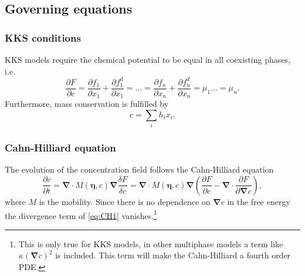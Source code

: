 \documentclass[12pt,a4paper]{article}
\newcommand{\vardiff}[2]{\frac{\delta#1}{\delta#2}}
\newcommand{\partdiff}[2]{\frac{\partial#1}{\partial#2}}
\providecommand{\vbf}[1]{\boldsymbol{#1}}
\providecommand{\gradient}[0]{\vbf{\nabla}}
\begin{document}
\subsection{Governing equations}
\subsubsection{KKS conditions}
KKS models require the chemical potential to be equal in all coexisting phases, i.e.
\begin{equation}
  \partdiff{F}{c}=\partdiff{f_1}{x_1}+\partdiff{f^d_1}{x_1}=\dots=\partdiff{f_n}{x_n}+\partdiff{f^d_n}{x_n}=\mu_1\dots=\mu_n.
  \label{eq:KKS}
\end{equation}
Furthermore, mass conservation is fulfilled by
\begin{equation}
  c=\sum_ih_ix_i.
  \label{eq:mass}
\end{equation}
\subsubsection{Cahn-Hilliard equation}
The evolution of the concentration field follows the Cahn-Hilliard equation
\begin{equation}
  \partdiff{c}{t}=\gradient\cdot M(\vbf{\eta},c)\gradient \vardiff{F}{c}=\gradient\cdot M(\vbf{\eta},c)\gradient\left(\partdiff{F}{c}-\gradient\cdot\partdiff{F}{\gradient c}\right),
  \label{eq:CH1}
\end{equation}
where $M$ is the mobility.
Since there is no dependence on $\gradient c$ in the free energy the divergence term of \cref{eq:CH1} vanishes.\footnote{This is only true for KKS models, in other multiphase models a term like $\kappa\left(\gradient c\right)^2$ is included.
This term will make the Cahn-Hilliard a fourth order PDE.}
\end{document}
